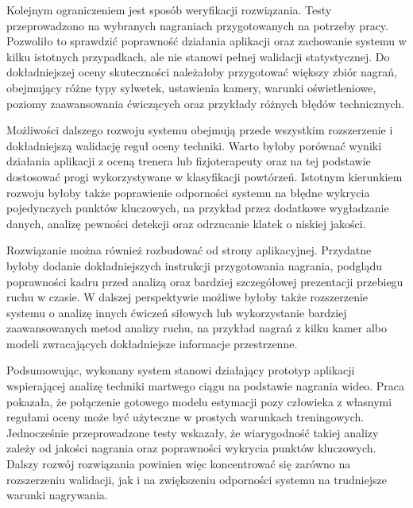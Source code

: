 Kolejnym ograniczeniem jest sposób weryfikacji rozwiązania. Testy przeprowadzono na wybranych nagraniach przygotowanych na potrzeby pracy. Pozwoliło to sprawdzić poprawność działania aplikacji oraz zachowanie systemu w kilku istotnych przypadkach, ale nie stanowi pełnej walidacji statystycznej. Do dokładniejszej oceny skuteczności należałoby przygotować większy zbiór nagrań, obejmujący różne typy sylwetek, ustawienia kamery, warunki oświetleniowe, poziomy zaawansowania ćwiczących oraz przykłady różnych błędów technicznych.

Możliwości dalszego rozwoju systemu obejmują przede wszystkim rozszerzenie i dokładniejszą walidację reguł oceny techniki. Warto byłoby porównać wyniki działania aplikacji z oceną trenera lub fizjoterapeuty oraz na tej podstawie dostosować progi wykorzystywane w klasyfikacji powtórzeń. Istotnym kierunkiem rozwoju byłoby także poprawienie odporności systemu na błędne wykrycia pojedynczych punktów kluczowych, na przykład przez dodatkowe wygładzanie danych, analizę pewności detekcji oraz odrzucanie klatek o niskiej jakości.

Rozwiązanie można również rozbudować od strony aplikacyjnej. Przydatne byłoby dodanie dokładniejszych instrukcji przygotowania nagrania, podglądu poprawności kadru przed analizą oraz bardziej szczegółowej prezentacji przebiegu ruchu w czasie. W dalszej perspektywie możliwe byłoby także rozszerzenie systemu o analizę innych ćwiczeń siłowych lub wykorzystanie bardziej zaawansowanych metod analizy ruchu, na przykład nagrań z kilku kamer albo modeli zwracających dokładniejsze informacje przestrzenne.

Podsumowując, wykonany system stanowi działający prototyp aplikacji wspierającej analizę techniki martwego ciągu na podstawie nagrania wideo. Praca pokazała, że połączenie gotowego modelu estymacji pozy człowieka z własnymi regułami oceny może być użyteczne w prostych warunkach treningowych. Jednocześnie przeprowadzone testy wskazały, że wiarygodność takiej analizy zależy od jakości nagrania oraz poprawności wykrycia punktów kluczowych. Dalszy rozwój rozwiązania powinien więc koncentrować się zarówno na rozszerzeniu walidacji, jak i na zwiększeniu odporności systemu na trudniejsze warunki nagrywania.